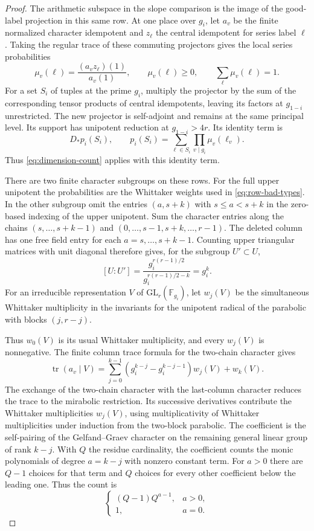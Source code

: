 \begin{proof}

The arithmetic subspace in the slope comparison is the image of
the good-label projection in this same row. At one place over
\(g_i\), let \(a_v\) be the finite normalized character idempotent
and \(z_\ell\) the central idempotent for series label \(\ell\).
Taking the regular trace of these commuting projectors gives
the local series probabilities
\[
 \mu_v(\ell)=\frac{(a_v z_\ell)(1)}{a_v(1)},\qquad
 \mu_v(\ell)\ge0,\qquad \sum_\ell\mu_v(\ell)=1 .
\] For a set \(S_i\) of tuples at the prime
\(g_i\), multiply the projector by the sum of the corresponding
tensor products of central idempotents, leaving its factors
at \(g_{1-i}\) unrestricted. The new projector is self-adjoint
and remains at the same principal level. Its support has
unipotent reduction at \(g_{1-i}>4r\). Its identity term is
\[
 D_*p_i(S_i),\qquad
 p_i(S_i)=\sum_{\ell\in S_i}\prod_{v\mid g_i}\mu_v(\ell_v).
\]
Thus \eqref{eq:dimension-count} applies with this identity term.


There are two finite character subgroups on these rows. For the
full upper unipotent the probabilities are the Whittaker weights
used in \eqref{eq:row-bad-types}. In the other subgroup omit the
entries \((a,s+k)\) with \(s\le a<s+k\) in the zero-based indexing
of the upper unipotent. Sum the character entries along the chains
\((s,\dots,s+k-1)\) and \((0,\dots,s-1,s+k,\dots,r-1)\).
The deleted column has one free field entry for each
\(a=s,\ldots,s+k-1\). Counting upper triangular matrices with
unit diagonal therefore gives, for the subgroup \(U'\subset U\),
\[
 [U:U']=\frac{g_i^{r(r-1)/2}}{g_i^{r(r-1)/2-k}}=g_i^k .
\]
For an irreducible representation \(V\) of
\(\mathrm{GL}_r(\mathbb F_{g_i})\), let \(w_j(V)\) be the simultaneous
Whittaker multiplicity in the invariants for the unipotent radical
of the parabolic with blocks \((j,r-j)\).

Thus \(w_0(V)\) is its usual
Whittaker multiplicity, and every \(w_j(V)\) is nonnegative.
The finite column trace formula for the two-chain character gives
\[
\operatorname{tr}(a_v\mid V)
   =\sum_{j=0}^{k-1}(g_i^{k-j}-g_i^{k-j-1})w_j(V)+w_k(V).
\]
The exchange of the two-chain character with the last-column
character reduces the trace to the mirabolic restriction. Its
successive derivatives contribute the Whittaker multiplicities
\(w_j(V)\), using multiplicativity of Whittaker multiplicities
under induction from the two-block parabolic. The coefficient
is the self-pairing of the Gelfand--Graev character on the
remaining general linear group of rank \(k-j\). With \(Q\) the residue cardinality, the coefficient counts the monic polynomials of degree \(a=k-j\) with nonzero constant term. For \(a>0\) there are \(Q-1\) choices for that term and \(Q\) choices for every other coefficient below the leading one. Thus the count is 
\[
 \begin{cases}(Q-1)Q^{a-1},&a>0,\\ 1,&a=0.\end{cases}
\]


\end{proof}

